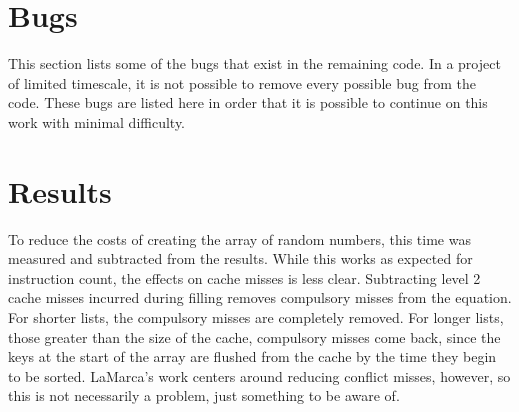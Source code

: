 \label{bugs}
\section{Bugs}
This section lists some of the bugs that exist in the remaining code. In a
project of limited timescale, it is not possible to remove every possible bug
from the code. These bugs are listed here in order that it is possible to
continue on this work with minimal difficulty.

\section{Results}
\label{bug3}
To reduce the costs of creating the array of random numbers, this time was
measured and subtracted from the results. While this works as expected for
instruction count, the effects on cache misses is less clear. Subtracting level
2 cache misses incurred during filling removes compulsory misses from the
equation. For shorter lists, the compulsory misses are completely removed.
For longer lists, those greater than the size of the cache, compulsory misses
come back, since the keys at the start of the array are flushed from the cache
by the time they begin to be sorted. LaMarca's work centers around
reducing conflict misses, however, so this is not necessarily a problem, just
something to be aware of.
